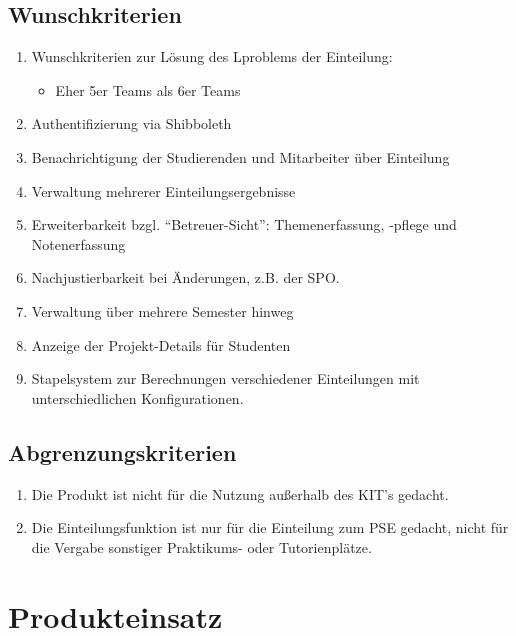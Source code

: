 \documentclass[parskip=full]{scrartcl}
\begin{document}
\subsection{Wunschkriterien}
\begin{enumerate}[{W}1]
    \item Wunschkriterien zur Lösung des Lproblems der Einteilung:
    \begin{itemize}
        \item Eher 5er Teams als 6er Teams
    \end{itemize}    
    
    \item Authentifizierung via Shibboleth

    \item Benachrichtigung der Studierenden und Mitarbeiter über Einteilung

    \item Verwaltung mehrerer Einteilungsergebnisse

    \item  Erweiterbarkeit bzgl. “Betreuer-Sicht”: Themenerfassung, -pflege und Notenerfassung
    
    \item Nachjustierbarkeit bei Änderungen, z.B. der SPO.
    
    \item Verwaltung über mehrere Semester hinweg
    
    \item Anzeige der Projekt-Details für Studenten
    
    \item Stapelsystem zur Berechnungen verschiedener Einteilungen mit unterschiedlichen Konfigurationen.
\end{enumerate}

\subsection{Abgrenzungskriterien}
\begin{enumerate}[{A}1]
 
  \item Die Produkt ist nicht für die Nutzung außerhalb des KIT's gedacht.

\item Die Einteilungsfunktion ist nur für die Einteilung zum PSE gedacht, nicht
für die Vergabe sonstiger Praktikums- oder Tutorienplätze.
  
\end{enumerate}
\section{Produkteinsatz}
\end{document}
